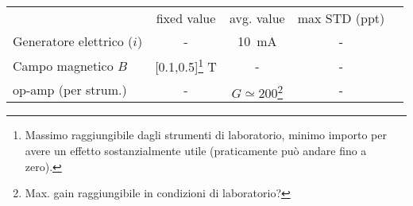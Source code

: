     \begin{tabular}{lcccc}
        \toprule
        & fixed value & avg. value & max STD (ppt)\\
        \colrule
        Generatore elettrico ($i$) & - & \SI{10}{\milli\ampere} & - \\
        Campo magnetico $B$ & [0.1,0.5]\footnote{Massimo raggiungibile dagli strumenti di laboratorio, minimo importo per avere un effetto sostanzialmente utile (praticamente può andare fino a zero).} \si{\tesla} & - & - \\
        op-amp (per strum.) & - & $G\simeq 200$\footnote{Max. gain raggiungibile in condizioni di laboratorio?} & - \\
        \toprule
    \end{tabular}
